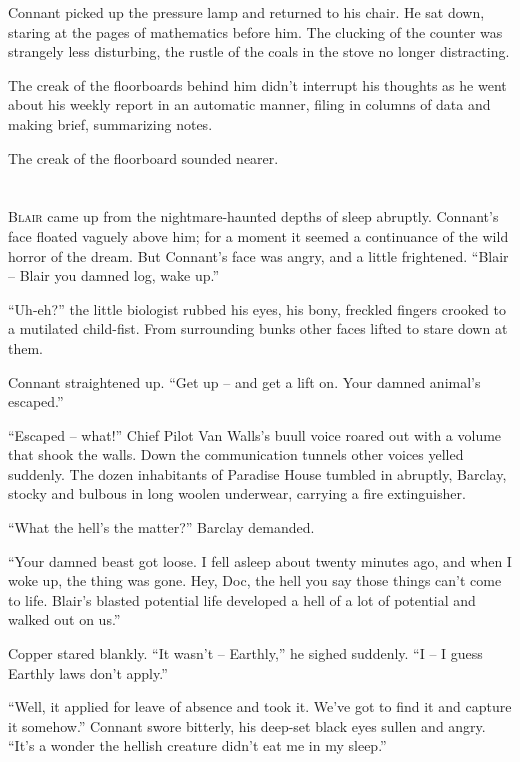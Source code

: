 \documentclass[ebook,oneside,11pt]{memoir}				%
\begin{document}
Connant picked up the pressure lamp and returned to his chair. He sat down, staring at the pages of mathematics before him. The clucking of the counter was strangely less disturbing, the rustle of the coals in the stove no longer distracting.

The creak of the floorboards behind him didn't interrupt his thoughts as he went about his weekly report in an automatic manner, filing in columns of data and making brief, summarizing notes.

The creak of the floorboard sounded nearer. 

\chapter[Chapter 5]{}
\lettrine[lines=3,findent=2pt,nindent=2pt]{B}{lair} came up from the nightmare-haunted depths of sleep abruptly. Connant's face floated vaguely above him; for a moment it seemed a continuance of the wild horror of the dream. But Connant's face was angry, and a little frightened. ``Blair -- Blair you damned log, wake up.''

``Uh-eh?'' the little biologist rubbed his eyes, his bony, freckled fingers crooked to a mutilated child-fist. From surrounding bunks other faces lifted to stare down at them.

Connant straightened up. ``Get up -- and get a lift on. Your damned animal's escaped.''

``Escaped -- what!'' Chief Pilot Van Walls's buull voice roared out with a volume that shook the walls. Down the communication tunnels other voices yelled suddenly. The dozen inhabitants of Paradise House tumbled in abruptly, Barclay, stocky and bulbous in long woolen underwear, carrying a fire extinguisher.

``What the hell's the matter?'' Barclay demanded.

``Your damned beast got loose. I fell asleep about twenty minutes ago, and when I woke up, the thing was gone. Hey, Doc, the hell you say those things can't come to life. Blair's blasted potential life developed a hell of a lot of potential and walked out on us.''

Copper stared blankly. ``It wasn't -- Earthly,'' he sighed suddenly. ``I -- I guess Earthly laws don't apply.''

``Well, it applied for leave of absence and took it. We've got to find it and capture it somehow.'' Connant swore bitterly, his deep-set black eyes sullen and angry. ``It's a wonder the hellish creature didn't eat me in my sleep.''
\end{document}
